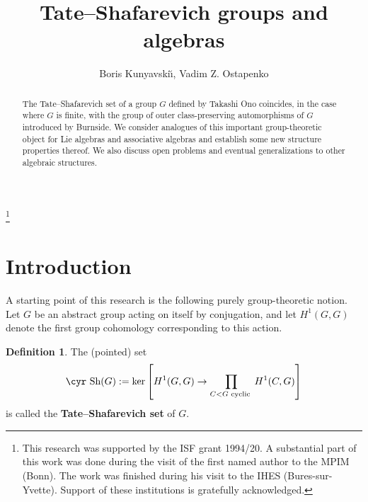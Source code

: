 \documentclass[11pt,reqno]{amsart}
\numberwithin{equation}{section}
\theoremstyle{definition}
\newtheorem{definition}[theorem]{Definition}
\def\Sha{\text{\cyr Sh}}
\begin{document}
\title{Tate--Shafarevich groups and algebras}

\author{Boris Kunyavski\u\i , Vadim Z. Ostapenko}






\address{Kunyavski\u\i : Department of
Mathematics, Bar-Ilan University, 5290002 Ramat Gan, ISRAEL}

\address{Ostapenko:  Department of
Mathematics, Bar-Ilan University, 5290002 Ramat Gan, ISRAEL}


\begin{abstract}
The Tate--Shafarevich set of a group $G$ defined by Takashi Ono coincides, in the case where
$G$ is finite, with the group of outer class-preserving automorphisms of $G$ introduced by
Burnside. We consider analogues of this important group-theoretic object for Lie algebras
and associative algebras and establish some new structure properties thereof. We also discuss
open problems and eventual generalizations to other algebraic structures.
\end{abstract}




\thanks{This research was supported by the ISF grant 1994/20. A substantial part
of this work was done during the visit of the first named author to the MPIM (Bonn). The work
was finished during his visit to the IHES (Bures-sur-Yvette).
Support of these institutions is gratefully acknowledged.}


\maketitle


\section{Introduction} \label{sec:intro}

A starting point of this research is the following purely group-theoretic notion.
Let $G$ be an abstract group acting on itself by conjugation, and let $H^1(G,G)$
denote the first group cohomology corresponding to this action.

\begin{definition}
The (pointed) set
\begin{equation} \label{Sha-gr}
\Sha(G):=\ker \left[ H^1(G,G)\to \prod_{C<G \text{ cyclic }}H^1(C,G) \right] 
\end{equation}
is called the {\bf Tate--Shafarevich set} of $G$.
\end{definition}
\end{document}
